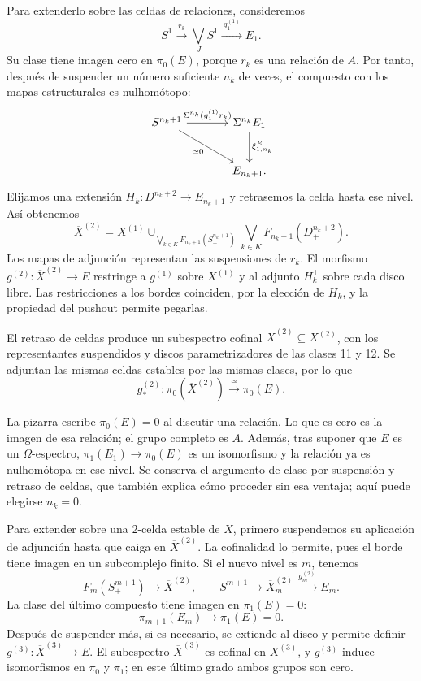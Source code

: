 Para extenderlo sobre las celdas de relaciones, consideremos
\[
S^1\xrightarrow{\ r_k\ }\bigvee_JS^1
\xrightarrow{\ g^{(1)}_1\ }E_1.
\]
Su clase tiene imagen cero en $\pi_0(E)$, porque $r_k$ es una relación de $A$. Por tanto, después de suspender un número suficiente $n_k$ de veces, el compuesto con los mapas estructurales es nulhomótopo:
\[
\begin{tikzcd}[column sep=large,row sep=large]
S^{n_k+1}\arrow[r,"\Sigma^{n_k}(g^{(1)}_1r_k)"]
\arrow[dr,"\simeq0"']
&\Sigma^{n_k}E_1\arrow[d,"\xi^E_{1,n_k}"]\\
&E_{n_k+1}.
\end{tikzcd}
\]
Elijamos una extensión $H_k\colon D^{n_k+2}\to E_{n_k+1}$ y retrasemos la celda hasta ese nivel. Así obtenemos
\[
\overline X^{(2)}=X^{(1)}
\cup_{\bigvee_{k\in K}F_{n_k+1}(S^{n_k+1}_+)}
\bigvee_{k\in K}F_{n_k+1}(D^{n_k+2}_+).
\]
Los mapas de adjunción representan las suspensiones de $r_k$. El morfismo $g^{(2)}\colon\overline X^{(2)}\to E$ restringe a $g^{(1)}$ sobre $X^{(1)}$ y al adjunto $H_k^\perp$ sobre cada disco libre. Las restricciones a los bordes coinciden, por la elección de $H_k$, y la propiedad del pushout permite pegarlas.

El retraso de celdas produce un subespectro cofinal $\overline X^{(2)}\subseteq X^{(2)}$, con los representantes suspendidos y discos parametrizadores de las clases 11 y 12. Se adjuntan las mismas celdas estables por las mismas clases, por lo que
\[
g^{(2)}_*\colon\pi_0(\overline X^{(2)})\xrightarrow{\ \simeq\ }\pi_0(E).
\]

\begin{nota}
La pizarra escribe $\pi_0(E)=0$ al discutir una relación. Lo que es cero es la imagen de esa relación; el grupo completo es $A$. Además, tras suponer que $E$ es un $\Omega$-espectro, $\pi_1(E_1)\to\pi_0(E)$ es un isomorfismo y la relación ya es nulhomótopa en ese nivel. Se conserva el argumento de clase por suspensión y retraso de celdas, que también explica cómo proceder sin esa ventaja; aquí puede elegirse $n_k=0$.
\end{nota}

Para extender sobre una $2$-celda estable de $X$, primero suspendemos su aplicación de adjunción hasta que caiga en $\overline X^{(2)}$. La cofinalidad lo permite, pues el borde tiene imagen en un subcomplejo finito. Si el nuevo nivel es $m$, tenemos
\[
F_m(S^{m+1}_+)\longrightarrow\overline X^{(2)},
\qquad
S^{m+1}\longrightarrow\overline X^{(2)}_m
\xrightarrow{\ g^{(2)}_m\ }E_m.
\]
La clase del último compuesto tiene imagen en $\pi_1(E)=0$:
\[
\pi_{m+1}(E_m)\longrightarrow\pi_1(E)=0.
\]
Después de suspender más, si es necesario, se extiende al disco y permite definir $g^{(3)}\colon\overline X^{(3)}\to E$. El subespectro $\overline X^{(3)}$ es cofinal en $X^{(3)}$, y $g^{(3)}$ induce isomorfismos en $\pi_0$ y $\pi_1$; en este último grado ambos grupos son cero.

